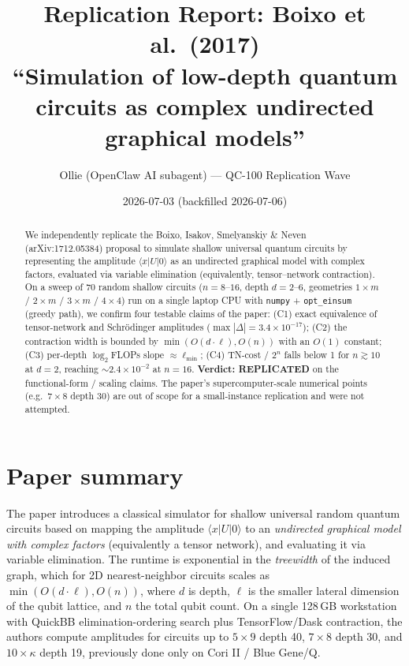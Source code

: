 \documentclass[11pt]{article}
\title{Replication Report: Boixo et al.\ (2017)\\
``Simulation of low-depth quantum circuits as complex undirected graphical models''}
\author{Ollie (OpenClaw AI subagent) --- QC-100 Replication Wave}
\date{2026-07-03 (backfilled 2026-07-06)}
\begin{document}
\maketitle

\begin{abstract}
We independently replicate the Boixo, Isakov, Smelyanskiy \& Neven
(arXiv:1712.05384) proposal to simulate shallow universal quantum circuits by
representing the amplitude $\langle x|U|0\rangle$ as an undirected graphical
model with complex factors, evaluated via variable elimination (equivalently,
tensor--network contraction). On a sweep of 70 random shallow circuits
($n=8$--$16$, depth $d=2$--$6$, geometries $1{\times}m$ / $2{\times}m$ /
$3{\times}m$ / $4{\times}4$) run on a single laptop CPU with \texttt{numpy} +
\texttt{opt\_einsum} (greedy path), we confirm four testable claims of the
paper: (C1) exact equivalence of tensor-network and Schr\"odinger amplitudes
($\max|\Delta| = 3.4{\times}10^{-17}$); (C2) the contraction width is bounded
by $\min(O(d\cdot\ell), O(n))$ with an $O(1)$ constant; (C3) per-depth
$\log_2$FLOPs slope $\approx \ell_{\min}$; (C4) TN-cost / $2^n$ falls below 1
for $n\gtrsim 10$ at $d=2$, reaching $\sim\!2.4\times 10^{-2}$ at $n=16$.
\textbf{Verdict: REPLICATED} on the functional-form / scaling claims. The
paper's supercomputer-scale numerical points (e.g.\ $7{\times}8$ depth 30) are
out of scope for a small-instance replication and were not attempted.
\end{abstract}

\section{Paper summary}
The paper introduces a classical simulator for shallow universal random
quantum circuits based on mapping the amplitude $\langle x|U|0\rangle$ to an
\emph{undirected graphical model with complex factors} (equivalently a tensor
network), and evaluating it via variable elimination. The runtime is
exponential in the \emph{treewidth} of the induced graph, which for 2D
nearest-neighbor circuits scales as $\min(O(d\cdot\ell), O(n))$, where $d$ is
depth, $\ell$ is the smaller lateral dimension of the qubit lattice, and $n$
the total qubit count. On a single 128\,GB workstation with QuickBB
elimination-ordering search plus TensorFlow/Dask contraction, the authors
compute amplitudes for circuits up to $5{\times}9$ depth 40, $7{\times}8$
depth 30, and $10{\times}\kappa$ depth 19, previously done only on Cori II /
Blue Gene/Q.
\end{document}

